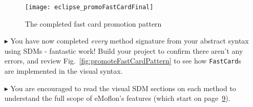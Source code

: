 \begin{itemize}
\begin{figure}[htp]
\begin{center}
  \texttt{[image: eclipse\_promoFastCardFinal]}
  \caption{The completed fast card promotion pattern}
  \label{fig:promoFastCardFinal}
\end{center}
\end{figure}

\vspace{0.5cm}

\item[$\blacktriangleright$] You have now completed \emph{every} method signature from your abstract syntax using SDMs - fantastic work! Build your project to
confirm there aren't any errors, and review Fig.~\ref{fig:promoteFastCardPattern} to see how \texttt{FastCard}s are implemented in the visual syntax.

\item[$\blacktriangleright$] You are encouraged to read the visual SDM sections on each method to understand the full scope of eMoflon's features (which start
on page~\hyperlink{page.9}{9}). 
  
\end{itemize}
